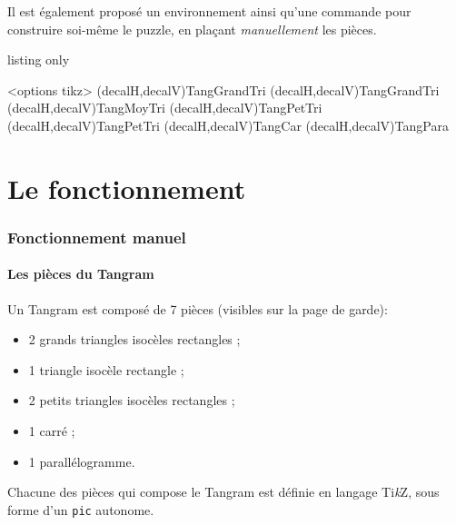 \documentclass{article}
\providecommand\tikzlogo{Ti\textit{k}Z}
\begin{document}
Il est également proposé un \textsf{environnement} ainsi qu'une \textsf{commande} pour construire soi-même le puzzle, en plaçant \textit{manuellement} les pièces.

\begin{PresentationCode}{listing only}
\begin{EnvTangramTikz}[clés]<options tikz>
	(decalH,decalV){TangGrandTri}
	(decalH,decalV){TangGrandTri}
	(decalH,decalV){TangMoyTri}
	(decalH,decalV){TangPetTri}
	(decalH,decalV){TangPetTri}
	(decalH,decalV){TangCar}
	(decalH,decalV){TangPara}
\end{EnvTangramTikz}
\end{PresentationCode}

\pagebreak

\part{Le fonctionnement}

\section{Fonctionnement \og manuel \fg}

\subsection{Les pièces du Tangram}

Un Tangram est composé de 7 pièces (visibles sur la page de garde):

\begin{itemize}
	\item 2 grands triangles isocèles rectangles ;
	\item 1 triangle isocèle rectangle ;
	\item 2 petits triangles isocèles rectangles ;
	\item 1 carré ;
	\item 1 parallélogramme.
\end{itemize}

Chacune des pièces qui compose le Tangram est définie en langage \tikzlogo, sous forme d'un \texttt{pic} autonome.
\end{document}

